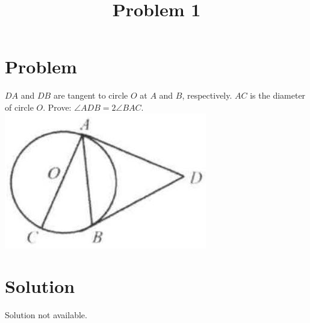 \documentclass{article}
\title{Problem 1}
\date{}
\begin{document}
\maketitle

\section*{Problem}
\(D A\) and \(D B\) are tangent to circle \(O\) at \(A\) and \(B\), respectively. \(A C\) is the diameter of circle \(O\). Prove: \(\angle A D B=2 \angle B A C\).\\
\centering
\includegraphics[width=\textwidth]{images/206(2).jpg}

\section*{Solution}
Solution not available.
\end{document}
